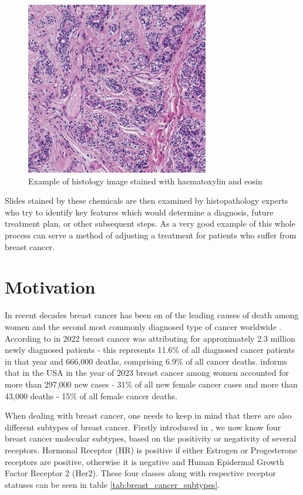 \begin{figure}[h]
\begin{centering}
\includegraphics[width=8cm]{assets/images/histology_image_example.png}
\par\end{centering}
\caption{Example of histology image stained with haematoxylin and eosin \label{fig:h&e-image}}
\end{figure}

Slides stained by these chemicals are then examined by histopathology experts who try to identify key features which would determine a diagnosis, future treatment plan, or other subsequent steps. As a very good example of this whole process can serve a method of adjusting a treatment for patients who suffer from breast cancer.

\section{Motivation}

In recent decades breast cancer has been on of the leading causes of death among women and the second most commonly diagnosed type of cancer worldwide \cite{Bray2024, Siegel2023}. According to \cite{Bray2024} in 2022 breast cancer was attributing for approximately 2.3 million newly diagnosed patients - this represents 11.6\% of all diagnosed cancer patients in that year and 666,000 deaths, comprising 6.9\% of all cancer deaths. \cite{Siegel2023} informs that in the USA in the year of 2023 breast cancer among women accounted for more than 297,000 new cases - 31\% of all new female cancer cases and more than 43,000 deaths - 15\% of all female cancer deaths.

When dealing with breast cancer, one needs to keep in mind that there are also different subtypes of breast cancer. Firstly introduced in \cite{Perou2000}, we now know four breast cancer molecular subtypes, based on the positivity or negativity of several receptors. Hormonal Receptor (HR) is positive if either Estrogen or Progesterone receptors are positive, otherwise it is negative and Human Epidermal Growth Factor Receptor 2 (Her2). These four classes along with respective receptor statuses can be seen in table \ref{tab:breast_cancer_subtypes}.

